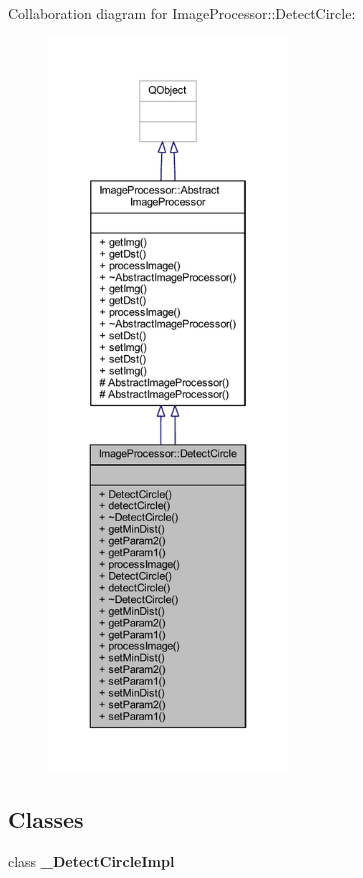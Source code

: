 Collaboration diagram for Image\+Processor\+:\+:Detect\+Circle\+:\nopagebreak
\begin{figure}[H]
\begin{center}
\leavevmode
\includegraphics[height=550pt]{d0/d8b/class_image_processor_1_1_detect_circle__coll__graph}
\end{center}
\end{figure}
\subsection*{Classes}
\begin{DoxyCompactItemize}
\item 
class {\bfseries \+\_\+\+Detect\+Circle\+Impl}
\end{DoxyCompactItemize}
